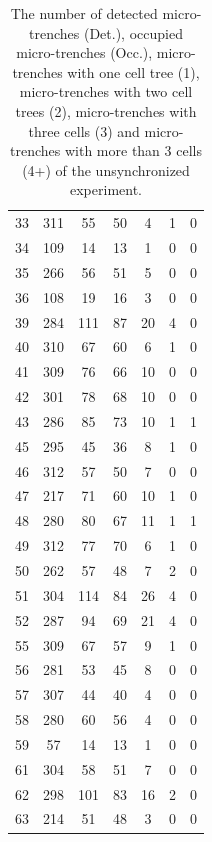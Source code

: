 \documentclass[pdftex,12pt,a4paper]{report}
\begin{document}
\begin{appendices}
\begin{table}[H]
\begin{tabular}[t]{ c | c | c | c | c | c | c }
\\
\hline\hline
33 & 311 & 55 & 50 & 4 & 1 & 0
\\
34 & 109 & 14 & 13 & 1 & 0 & 0
\\
35 & 266 & 56 & 51 & 5 & 0 & 0
\\
36 & 108 & 19 & 16 & 3 & 0 & 0
\\
39 & 284 & 111 & 87 & 20 & 4 & 0
\\
40 & 310 & 67 & 60 & 6 & 1 & 0
\\
41 & 309 & 76 & 66 & 10 & 0 & 0
\\
42 & 301 & 78 & 68 & 10 & 0 & 0
\\
43 & 286 & 85 & 73 & 10 & 1 & 1
\\
45 & 295 & 45 & 36 & 8 & 1 & 0
\\
46 & 312 & 57 & 50 & 7 & 0 & 0
\\
47 & 217 & 71 & 60 & 10 & 1 & 0
\\
48 & 280 & 80 & 67 & 11 & 1 & 1
\\
49 & 312 & 77 & 70 & 6 & 1 & 0
\\
50 & 262 & 57 & 48 & 7 & 2 & 0
\\
51 & 304 & 114 & 84 & 26 & 4 & 0
\\
52 & 287 & 94 & 69 & 21 & 4 & 0
\\
55 & 309 & 67 & 57 & 9 & 1 & 0
\\
56 & 281 & 53 & 45 & 8 & 0 & 0
\\
57 & 307 & 44 & 40 & 4 & 0 & 0
\\
58 & 280 & 60 & 56 & 4 & 0 & 0
\\
59 & 57 & 14 & 13 & 1 & 0 & 0
\\
61 & 304 & 58 & 51 & 7 & 0 & 0
\\
62 & 298 & 101 & 83 & 16 & 2 & 0
\\
63 & 214 & 51 & 48 & 3 & 0 & 0
\end{tabular}
\caption[The occupancy statistics of the unsynchronized experiment]{The number of detected micro-trenches (Det.), occupied micro-trenches (Occ.), micro-trenches with one cell tree (1), micro-trenches with two cell trees (2), micro-trenches with three cells (3) and micro-trenches with more than 3 cells (4+) of the unsynchronized experiment.}
\label{table:occupancy_statistics_unsyn}
\end{table}

\newpage


\end{appendices}
\end{document}
